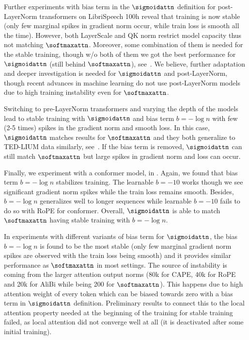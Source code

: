 Further experiments with bias term in the $\sigmoidattn$ definition for post-LayerNorm transformers on LibriSpeech 100h reveal that training is now stable (only few marginal spikes in gradient norm occur, while train loss is smooth all the time). However, both LayerScale and QK norm restrict model capacity thus not matching $\softmaxattn$. Moreover, some combination of them is needed for the stable training, though w/o both of them we got the best performance for $\sigmoidattn$ (still behind $\softmaxattn$), see~.
We believe, further adaptation and deeper investigation is needed for $\sigmoidattn$ and post-LayerNorm, though recent advances in machine learning do not use post-LayerNorm models due to high training instability even for $\softmaxattn$.

Switching to pre-LayerNorm transformers and varying the depth of the models lead to stable training with $\sigmoidattn$ and bias term $b=-\log n$ with few (2-5 times) spikes in the gradient norm and smooth loss. In this case, $\sigmoidattn$ matches results for $\softmaxattn$ and they both generalize to TED-LIUM data similarly, see~. If the bias term is removed, $\sigmoidattn$ can still match $\softmaxattn$ but large spikes in gradient norm and loss can occur.

Finally, we experiment with a conformer model, in . Again, we found that bias term $b=-\log n$ stabilizes training. The learnable $b=-10$ works though we see significant gradient norm spikes while the train loss remains smooth. Besides,  $b=-\log n$ generalizes well to longer sequences while learnable $b=-10$ fails to do so with RoPE for conformer. Overall, $\sigmoidattn$ is able to match $\softmaxattn$ having stable training with  $b=-\log n$.

In experiments with different variants of bias term for $\sigmoidattn$, the bias $b=-\log n$ is found to be the most stable (only few marginal gradient norm spikes are observed with the train loss being smooth) and it provides similar performance as $\softmaxattn$ in most settings. 
The source of instability is coming from the larger attention output norms (80k for CAPE, 40k for RoPE and 20k for AliBi while being 200 for $\softmaxattn$). This happens due to high attention weight of every token which can be biased towards zero with a bias term in $\sigmoidattn$ definition.
Preliminary results to connect this to the local attention property needed at the beginning of the training for stable training failed, as local attention did not converge well at all (it is deactivated after some initial training).

